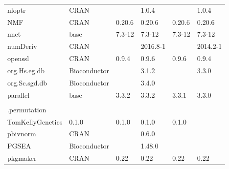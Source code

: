 \begin{longtable}{llllll}
\rowcolor{black!10}
nloptr                        & \acrshort{CRAN}                      &             & 1.0.4       &                & 1.0.4             \\
\rowcolor{black!5}
NMF                           & \acrshort{CRAN}                      & 0.20.6      & 0.20.6      & 0.20.6         & 0.20.6             \\
\rowcolor{black!10}
nnet                          & base                      & 7.3-12      & 7.3-12      & 7.3-12         & 7.3-12            \\
\rowcolor{black!5}
numDeriv                      & \acrshort{CRAN}                      &             & 2016.8-1    &                & 2014.2-1           \\
\rowcolor{black!10}
openssl                       & \acrshort{CRAN}                      & 0.9.4       & 0.9.6       & 0.9.6          & 0.9.4             \\
\rowcolor{black!5}
org.Hs.eg.db                  & Bioconductor              &             & 3.1.2       &                & 3.3.0              \\
\rowcolor{black!10}
org.Sc.sgd.db                 & Bioconductor              &             & 3.4.0       &                &                   \\
\rowcolor{black!5}
parallel                      & base                      & 3.3.2       & 3.3.2       & 3.3.1          & 3.3.0              \\
\rowcolor{black!10}
\begin{tabular}[c]{@{}l@{}}pathway.structure\\.permutation \end{tabular} & \begin{tabular}[c]{@{}l@{}}GitHub \\ TomKellyGenetics \end{tabular}  & 0.1.0       & 0.1.0       & 0.1.0          & 0.1.0             \\
\rowcolor{black!5}
pbivnorm                      & \acrshort{CRAN}                      &             & 0.6.0       &                &                    \\
\rowcolor{black!10}
PGSEA                         & Bioconductor              &             & 1.48.0      &                &                   \\
\rowcolor{black!5}
pkgmaker                      & \acrshort{CRAN}                      & 0.22        & 0.22        & 0.22           & 0.22               \\

\end{longtable}
